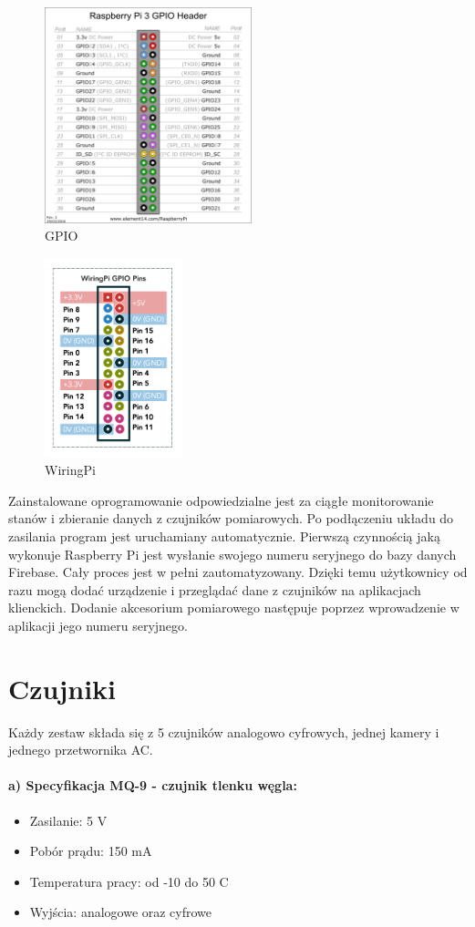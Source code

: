 \begin{figure}[ht]
	\centering
	\includegraphics[width=6cm]{gpio.png}
        \caption{GPIO}
\end{figure}
\begin{figure}[ht]
	\centering
	\includegraphics[width=4cm]{wiringpi.png}
        \caption{WiringPi}
\end{figure}
Zainstalowane oprogramowanie odpowiedzialne jest za ciągłe monitorowanie stanów i zbieranie danych z czujników pomiarowych. Po podłączeniu układu do zasilania program jest uruchamiany automatycznie. Pierwszą czynnością jaką wykonuje Raspberry Pi jest wysłanie swojego numeru seryjnego do bazy danych Firebase. Cały proces jest w pełni zautomatyzowany. Dzięki temu użytkownicy od razu mogą dodać urządzenie i przeglądać dane z czujników na aplikacjach klienckich. Dodanie akcesorium pomiarowego następuje poprzez wprowadzenie w aplikacji jego numeru seryjnego.
\section{Czujniki}
Każdy zestaw składa się z 5 czujników analogowo cyfrowych,  jednej kamery i jednego przetwornika AC. 
\paragraph{a) Specyfikacja MQ-9 - czujnik tlenku węgla:}
\begin{itemize} 
\item Zasilanie: 5 V
\item Pobór prądu: 150 mA
\item Temperatura pracy: od -10 do 50 \textdegree{}C
\item Wyjścia: analogowe oraz cyfrowe
\end{itemize}
